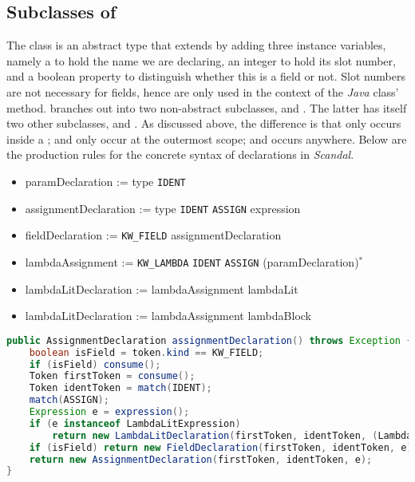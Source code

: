 \subsection{Subclasses of }

The class  is an abstract type that extends  by adding three instance variables, namely a  to hold the name we are declaring, an integer to hold its slot number, and a boolean property to distinguish whether this is a field or not. Slot numbers are not necessary for fields, hence are only used in the context of the \emph{Java} class'  method.  branches out into two non-abstract subclasses,  and . The latter has itself two other subclasses,  and . As discussed above, the difference is that  only occurs inside a ;  and  only occur at the outermost scope; and  occurs anywhere. Below are the production rules for the concrete syntax of declarations in \emph{Scandal}.

\begin{itemize}
	\item paramDeclaration := type \texttt{IDENT}
	\item assignmentDeclaration := type \texttt{IDENT} \texttt{ASSIGN} expression
	\item fieldDeclaration := \texttt{KW\_FIELD} assignmentDeclaration
	\item lambdaAssignment := \texttt{KW\_LAMBDA} \texttt{IDENT} \texttt{ASSIGN} (paramDeclaration)$^*$
	\item lambdaLitDeclaration := lambdaAssignment lambdaLit
	\item lambdaLitDeclaration := lambdaAssignment lambdaBlock
\end{itemize}

\begin{lstlisting}[language=Java,caption={Parsing Top-Level Declarations.},label={alg:assign}]
public AssignmentDeclaration assignmentDeclaration() throws Exception {
	boolean isField = token.kind == KW_FIELD;
	if (isField) consume();
	Token firstToken = consume();
	Token identToken = match(IDENT);
	match(ASSIGN);
	Expression e = expression();
	if (e instanceof LambdaLitExpression)
		return new LambdaLitDeclaration(firstToken, identToken, (LambdaLitExpression) e);
	if (isField) return new FieldDeclaration(firstToken, identToken, e);
	return new AssignmentDeclaration(firstToken, identToken, e);
}
\end{lstlisting}

